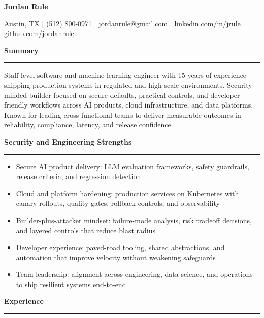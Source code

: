 \documentclass[10pt,letterpaper]{article}
\newenvironment{tightitemize}{%
  \begin{itemize}
    \setlength{\itemsep}{2pt}
    \setlength{\topsep}{2pt}
    \setlength{\parsep}{0pt}
    \setlength{\partopsep}{0pt}
}{%
  \end{itemize}
}
\newcommand{\nameheader}[1]{%
  {\LARGE \textbf{#1}}\par
}
\newcommand{\contactline}[1]{%
  {\small #1}\par
}
\newcommand{\sectiontitle}[1]{%
  \vspace{0.6em}
  {\large \textbf{#1}}\par
  \vspace{0.15em}
  \hrule
  \vspace{0.35em}
}
\begin{document}
\nameheader{Jordan Rule}
\contactline{Austin, TX \;|\; (512) 800-0971 \;|\; \href{mailto:jordanrule@gmail.com}{jordanrule@gmail.com} \;|\; \href{https://www.linkedin.com/in/jrule/}{linkedin.com/in/jrule} \;|\; \href{https://github.com/jordanrule}{github.com/jordanrule}}

\sectiontitle{Summary}
Staff-level software and machine learning engineer with 15 years of experience shipping production systems in regulated and high-scale environments. Security-minded builder focused on secure defaults, practical controls, and developer-friendly workflows across AI products, cloud infrastructure, and data platforms. Known for leading cross-functional teams to deliver measurable outcomes in reliability, compliance, latency, and release confidence.

\sectiontitle{Security and Engineering Strengths}
\begin{tightitemize}
  \item Secure AI product delivery: LLM evaluation frameworks, safety guardrails, release criteria, and regression detection
  \item Cloud and platform hardening: production services on Kubernetes with canary rollouts, quality gates, rollback controls, and observability
  \item Builder-plus-attacker mindset: failure-mode analysis, risk tradeoff decisions, and layered controls that reduce blast radius
  \item Developer experience: paved-road tooling, shared abstractions, and automation that improve velocity without weakening safeguards
  \item Team leadership: alignment across engineering, data science, and operations to ship resilient systems end-to-end
\end{tightitemize}

\sectiontitle{Experience}
\end{document}
